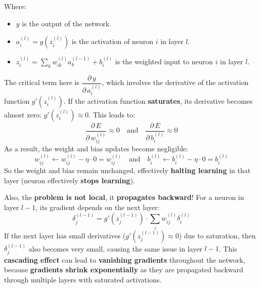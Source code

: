 \noindent
Where:
\begin{itemize}
    \item $y$ is the output of the network.
    \item $a_{i}^{(l)} = g\left(z_{i}^{(l)}\right)$ is the activation of neuron $i$ in layer $l$.
    \item $z_{i}^{(l)} = \displaystyle\sum_{k} w_{ik}^{(l)} a_{k}^{(l-1)} + b_{i}^{(l)}$ is the weighted input to neuron $i$ in layer $l$.
\end{itemize}
The critical term here is $\dfrac{\partial \, y}{\partial \, a_{i}^{(l)}}$, which involves the derivative of the activation function $g'\left(z_{i}^{(l)}\right)$. If the activation function \textbf{saturates}, its derivative becomes almost zero: $g'\left(z_{i}^{(l)}\right) \approx 0$. This leads to:
\begin{equation*}
    \dfrac{\partial \, E}{\partial \, w_{ij}^{(l)}} \approx 0 \quad \text{and} \quad \dfrac{\partial \, E}{\partial \, b_{i}^{(l)}} \approx 0
\end{equation*}
As a result, the weight and bias updates become negligible:
\begin{equation*}
    w_{ij}^{(l)} \leftarrow w_{ij}^{(l)} - \eta \cdot 0 = w_{ij}^{(l)}
    \quad \text{and} \quad
    b_{i}^{(l)} \leftarrow b_{i}^{(l)} - \eta \cdot 0 = b_{i}^{(l)}
\end{equation*}
So the weight and bias remain unchanged, effectively \textbf{halting learning} in that layer (neuron effectively \textbf{stops learning}).

\highspace
Also, the \textbf{problem is not local}, it \textbf{propagates backward}! For a neuron in layer $l-1$, its gradient depends on the next layer:
\begin{equation*}
    \delta_{j}^{(l-1)} = g'(z_{j}^{(l-1)}) \cdot \sum_{i} w_{ij}^{(l)} \delta_{i}^{(l)}
\end{equation*}
If the next layer has small derivatives ($g'(z_{j}^{(l-1)}) \approx 0$) due to saturation, then $\delta_{j}^{(l-1)}$ also becomes very small, causing the same issue in layer $l-1$. This \textbf{cascading effect} can lead to \textbf{vanishing gradients} throughout the network, because \textbf{gradients shrink exponentially} as they are propagated backward through multiple layers with saturated activations.

